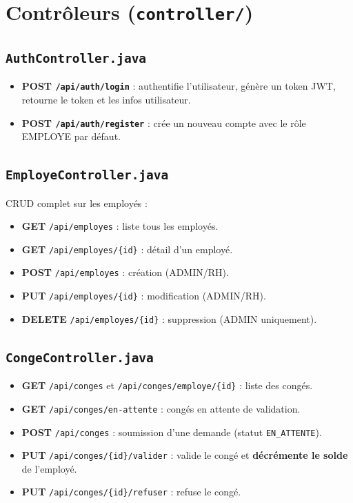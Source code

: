 \documentclass[a4paper,12pt]{report}
\begin{document}
\section{Contrôleurs (\texttt{controller/})}

\subsection{\texttt{AuthController.java}}
\begin{itemize}
  \item \textbf{POST \texttt{/api/auth/login}} : authentifie l'utilisateur, génère un token JWT, retourne le token et les infos utilisateur.
  \item \textbf{POST \texttt{/api/auth/register}} : crée un nouveau compte avec le rôle EMPLOYE par défaut.
\end{itemize}

\subsection{\texttt{EmployeController.java}}
CRUD complet sur les employés :
\begin{itemize}
  \item \textbf{GET} \texttt{/api/employes} : liste tous les employés.
  \item \textbf{GET} \texttt{/api/employes/\{id\}} : détail d'un employé.
  \item \textbf{POST} \texttt{/api/employes} : création (ADMIN/RH).
  \item \textbf{PUT} \texttt{/api/employes/\{id\}} : modification (ADMIN/RH).
  \item \textbf{DELETE} \texttt{/api/employes/\{id\}} : suppression (ADMIN uniquement).
\end{itemize}

\subsection{\texttt{CongeController.java}}
\begin{itemize}
  \item \textbf{GET} \texttt{/api/conges} et \texttt{/api/conges/employe/\{id\}} : liste des congés.
  \item \textbf{GET} \texttt{/api/conges/en-attente} : congés en attente de validation.
  \item \textbf{POST} \texttt{/api/conges} : soumission d'une demande (statut \texttt{EN\_ATTENTE}).
  \item \textbf{PUT} \texttt{/api/conges/\{id\}/valider} : valide le congé et \textbf{décrémente le solde} de l'employé.
  \item \textbf{PUT} \texttt{/api/conges/\{id\}/refuser} : refuse le congé.
\end{itemize}
\end{document}

